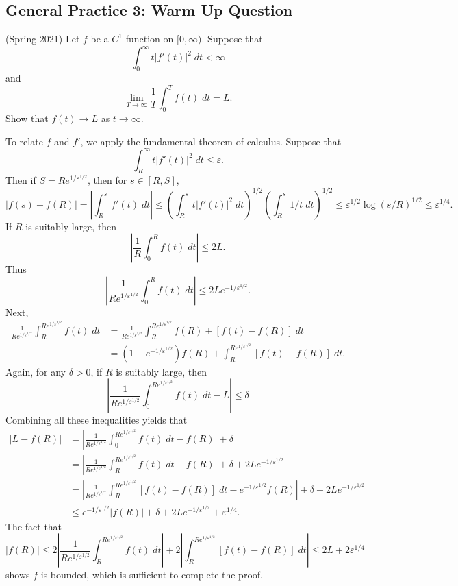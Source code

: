 \documentclass[answers]{exam}
\begin{document}
\begin{questions}
\newpage
\section{General Practice 3: Warm Up Question}

\question (Spring 2021) Let $f$ be a $C^1$ function on $[0,\infty)$. Suppose that
%
\[ \int_0^\infty t |f'(t)|^2\; dt < \infty \]
%
and
%
\[ \lim_{T \to \infty} \frac{1}{T} \int_0^T f(t)\; dt = L. \]
%
Show that $f(t) \to L$ as $t \to \infty$.
\begin{solution}
    To relate $f$ and $f'$, we apply the fundamental theorem of calculus. Suppose that
    \[ \int_R^\infty t |f'(t)|^2\; dt \leq \varepsilon. \]
    Then if $S = R e^{1/\varepsilon^{1/2}}$, then for $s \in [R,S]$,
    \[ |f(s) - f(R)| = \left| \int_R^s f'(t)\; dt \right| \leq \left( \int_R^s t |f'(t)|^2\; dt \right)^{1/2} \left( \int_R^s 1/t\; dt \right)^{1/2} \leq \varepsilon^{1/2} \log(s/R)^{1/2} \leq \varepsilon^{1/4}. \]
    If $R$ is suitably large, then
    \[ \left| \frac{1}{R} \int_0^R f(t)\; dt \right| \leq 2L. \]
    Thus
    \[ \left| \frac{1}{R e^{1/\varepsilon^{1/2}}} \int_0^R f(t)\; dt \right| \leq 2L e^{-1/\varepsilon^{1/2}}. \]
    Next,
    \begin{align*}
        \frac{1}{R e^{1/\varepsilon^{1/2}}} \int_R^{Re^{1/\varepsilon^{1/2}}} f(t)\; dt &= \frac{1}{R e^{1/\varepsilon^{1/2}}} \int_R^{Re^{1/\varepsilon^{1/2}}} f(R) + [f(t) - f(R)]\; dt\\
        &= \left( 1 - e^{-1/\varepsilon^{1/2}} \right) f(R) + \int_R^{R e^{1/\varepsilon^{1/2}}} [f(t) - f(R)]\; dt.
    \end{align*}
    Again, for any $\delta > 0$, if $R$ is suitably large, then
    \[ \left| \frac{1}{R e^{1/\varepsilon^{1/2}}} \int_0^{R e^{1/\varepsilon^{1/2}}} f(t)\; dt - L \right| \leq \delta \]
    Combining all these inequalities yields that
    \begin{align*}
        |L - f(R)| &= \left| \frac{1}{R e^{1/\varepsilon^{1/2}}} \int_0^{R e^{1/\varepsilon^{1/2}}} f(t)\; dt - f(R) \right| + \delta\\
        &= \left| \frac{1}{R e^{1/\varepsilon^{1/2}}} \int_R^{R e^{1/\varepsilon^{1/2}}} f(t)\; dt - f(R) \right| + \delta + 2Le^{-1/\varepsilon^{1/2}}\\
        &= \left| \frac{1}{R e^{1/\varepsilon^{1/2}}} \int_R^{R e^{1/\varepsilon^{1/2}}} [f(t) - f(R)]\; dt - e^{-1/\varepsilon^{1/2}} f(R) \right| + \delta + 2Le^{-1/\varepsilon^{1/2}}\\
        &\leq e^{-1/\varepsilon^{1/2}} |f(R)| + \delta + 2L e^{-1/\varepsilon^{1/2}} + \varepsilon^{1/4}.
    \end{align*}
    The fact that
    \[ |f(R)| \leq 2 \left| \frac{1}{R e^{1/\varepsilon^{1/2}}} \int_R^{Re^{1/\varepsilon^{1/2}}} f(t)\; dt \right| + 2 \left| \int_R^{R e^{1/\varepsilon^{1/2}}} [f(t) - f(R)]\; dt \right| \leq 2L + 2 \varepsilon^{1/4} \]
    shows $f$ is bounded, which is sufficient to complete the proof.
\end{solution}



\end{questions}
\end{document}
